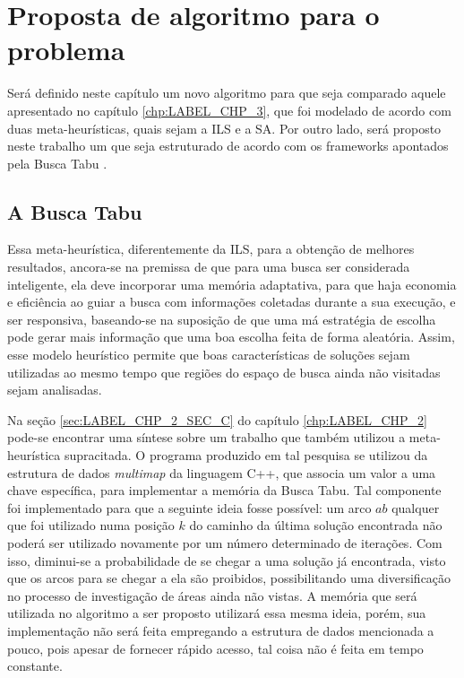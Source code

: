 \chapter{Proposta de algoritmo para o problema}\label{chp:LABEL_CHP_6}

\par Será definido neste capítulo um novo algoritmo para que seja comparado aquele apresentado no capítulo \ref{chp:LABEL_CHP_3}, que foi modelado de acordo com duas meta-heurísticas, quais sejam a ILS e a SA. Por outro lado, será proposto neste trabalho um que seja estruturado de acordo com os frameworks apontados pela Busca Tabu \citet{glover}.

\section{A Busca Tabu}\label{sec:LABEL_CHP_6_SEC_A}

\par Essa meta-heurística, diferentemente da ILS, para a obtenção de melhores resultados, ancora-se na premissa de que para uma busca ser considerada inteligente, ela deve incorporar uma memória adaptativa, para que haja economia e eficiência ao guiar a busca com informações coletadas durante a sua execução, e ser responsiva, baseando-se na suposição de que uma má estratégia de escolha pode gerar mais informação que uma boa escolha feita de forma aleatória. Assim, esse modelo heurístico permite que boas características de soluções sejam utilizadas ao mesmo tempo que regiões do espaço de busca ainda não visitadas sejam analisadas.

\par Na seção \ref{sec:LABEL_CHP_2_SEC_C} do capítulo \ref{chp:LABEL_CHP_2} pode-se encontrar uma síntese sobre um trabalho que também utilizou a meta-heurística supracitada. O programa produzido em tal pesquisa se utilizou da estrutura de dados \textit{multimap} da linguagem C++, que associa um valor a uma chave específica, para implementar a memória da Busca Tabu. Tal componente foi implementado para que a seguinte ideia fosse possível: um arco $ab$ qualquer que foi utilizado numa posição $k$ do caminho da última solução encontrada não poderá ser utilizado novamente por um número determinado de iterações. Com isso, diminui-se a probabilidade de se chegar a uma solução já encontrada, visto que os arcos para se chegar a ela são proibidos, possibilitando uma diversificação no processo de investigação de áreas ainda não vistas. A memória que será utilizada no algoritmo a ser proposto utilizará essa mesma ideia, porém, sua implementação não será feita empregando a estrutura de dados mencionada a pouco, pois apesar de fornecer rápido acesso, tal coisa não é feita em tempo constante.


